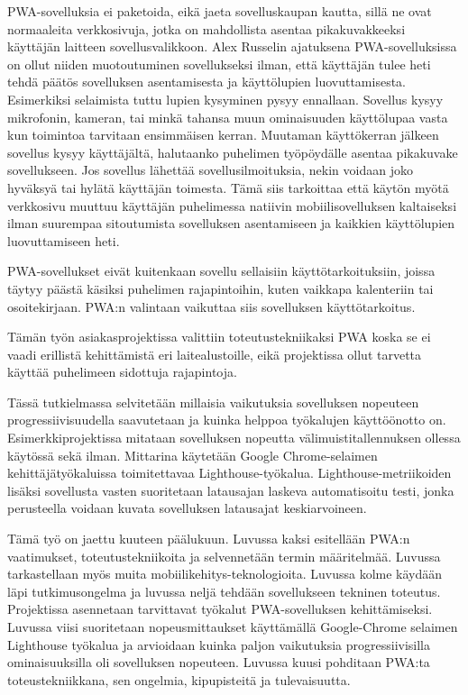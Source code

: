 \documentclass{tktltiki}
\begin{document}
PWA-sovelluksia ei paketoida, eikä jaeta sovelluskaupan kautta, sillä ne ovat normaaleita verkkosivuja, jotka on mahdollista asentaa pikakuvakkeeksi käyttäjän laitteen sovellusvalikkoon. Alex  Russelin ajatuksena \cite{Russell} PWA-sovelluksissa on ollut niiden muotoutuminen sovellukseksi ilman, että käyttäjän tulee heti tehdä päätös sovelluksen asentamisesta ja käyttölupien luovuttamisesta. Esimerkiksi selaimista tuttu lupien kysyminen pysyy ennallaan. Sovellus kysyy mikrofonin, kameran, tai minkä tahansa muun ominaisuuden käyttölupaa vasta kun toimintoa tarvitaan ensimmäisen kerran. Muutaman käyttökerran jälkeen sovellus kysyy käyttäjältä, halutaanko puhelimen työpöydälle asentaa pikakuvake sovellukseen. Jos sovellus lähettää sovellusilmoituksia, nekin voidaan joko hyväksyä tai hylätä käyttäjän toimesta. Tämä siis tarkoittaa että käytön myötä verkkosivu muuttuu käyttäjän puhelimessa natiivin mobiilisovelluksen kaltaiseksi ilman suurempaa sitoutumista sovelluksen asentamiseen ja kaikkien käyttölupien luovuttamiseen heti. 

PWA-sovellukset eivät kuitenkaan sovellu sellaisiin käyttötarkoituksiin, joissa täytyy päästä käsiksi puhelimen rajapintoihin, kuten vaikkapa kalenteriin tai osoitekirjaan. PWA:n valintaan vaikuttaa siis sovelluksen käyttötarkoitus. 

Tämän työn asiakasprojektissa valittiin toteutustekniikaksi PWA koska se ei vaadi erillistä kehittämistä eri laitealustoille, eikä projektissa ollut tarvetta käyttää puhelimeen sidottuja rajapintoja.

Tässä tutkielmassa selvitetään millaisia vaikutuksia sovelluksen nopeuteen progressiivisuudella saavutetaan ja kuinka helppoa työkalujen käyttöönotto on. Esimerkkiprojektissa mitataan sovelluksen nopeutta välimuistitallennuksen ollessa käytössä sekä ilman. Mittarina käytetään Google Chrome-selaimen kehittäjätyökaluissa toimitettavaa Lighthouse-työkalua. Lighthouse-metriikoiden lisäksi sovellusta vasten suoritetaan latausajan laskeva automatisoitu testi, jonka perusteella voidaan kuvata sovelluksen latausajat keskiarvoineen. 

Tämä työ on jaettu kuuteen päälukuun. Luvussa kaksi esitellään PWA:n vaatimukset, toteutustekniikoita ja selvennetään termin määritelmää. Luvussa tarkastellaan myös muita mobiilikehitys-teknologioita. Luvussa kolme käydään läpi tutkimusongelma ja luvussa neljä tehdään sovellukseen tekninen toteutus. Projektissa asennetaan tarvittavat työkalut PWA-sovelluksen kehittämiseksi. Luvussa viisi suoritetaan nopeusmittaukset käyttämällä Google-Chrome selaimen Lighthouse työkalua ja arvioidaan kuinka paljon vaikutuksia progressiivisilla ominaisuuksilla oli sovelluksen nopeuteen. Luvussa kuusi pohditaan PWA:ta toteustekniikkana, sen ongelmia, kipupisteitä ja tulevaisuutta.
\end{document}
